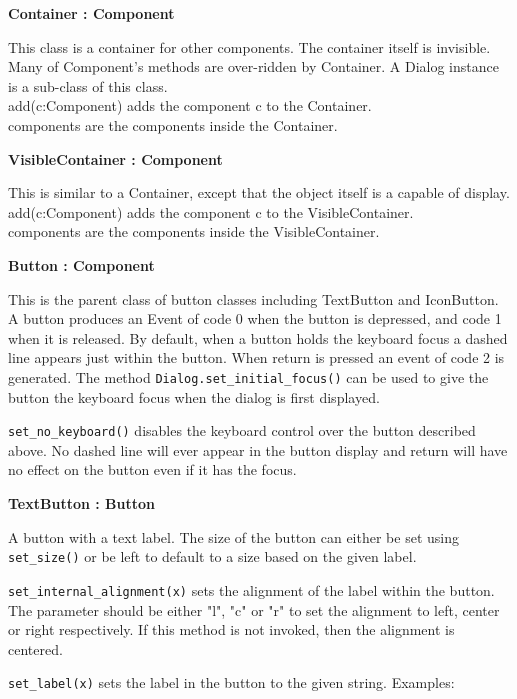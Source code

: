 {\ttfamily\bfseries
{}Container : Component}

This class is a container for other components. The container itself is
invisible. Many of Component's methods are over-ridden
by Container. A Dialog instance is a sub-class of this
class.\\
add(c:Component) adds the component c to the Container.\\
components are the components inside the Container.

{\ttfamily\bfseries
{}VisibleContainer : Component}

This is similar to a Container, except that the object itself is a
capable of display.\\
add(c:Component) adds the component c to the VisibleContainer.\\
components are the components inside the VisibleContainer.

{\ttfamily\bfseries
{}Button : Component}

This is the parent class of button classes including TextButton and
IconButton. A button produces an Event of code 0 when the button is
depressed, and code 1 when it is released. By default, when a button
holds the keyboard focus a dashed line appears just
within the button. When return is pressed an event of code 2 is
generated. The method \texttt{Dialog.set\_initial\_focus()} can be used to give
the button the keyboard focus when the dialog is first displayed.

\texttt{set\_no\_keyboard()} disables the keyboard control over the button
described above. No dashed line will ever appear in the button
display and return will have no effect on the button even if it has the
focus.

{\ttfamily\bfseries
{}TextButton : Button}

A button with a text label. The size of the button can either be set
using \texttt{set\_size()} or be left to default to a size based on the given
label.

\texttt{set\_internal\_alignment(x)} sets the alignment of the label within the
button. The parameter should be either "l", "c" or "r" to
set the alignment to left, center or right respectively. If this method
is not invoked, then the alignment is centered.

\texttt{set\_label(x)} sets the label in the button to the given string.
Examples:


